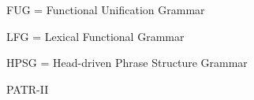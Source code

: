 \documentclass[a4paper]{article}
\title{}
\date{}
\author{Mohammad Rahmani}
\begin{document}
    \maketitle
    
    FUG  = Functional Unification Grammar
    
    LFG  = Lexical Functional Grammar
    
    HPSG = Head-driven Phrase Structure Grammar
    
    PATR-II
    
    
\end{document}
